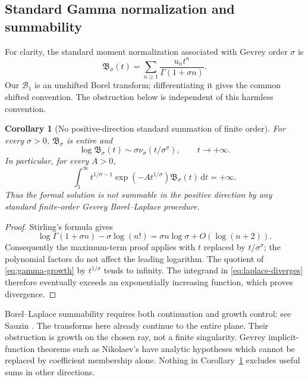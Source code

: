 \documentclass[11pt,a4paper]{article}
\numberwithin{equation}{section}
\newtheorem{corollary}[theorem]{Corollary}
\theoremstyle{definition}
\theoremstyle{remark}
\newcommand{\Bcal}{\mathcal B}
\newcommand{\dd}{\,\mathrm d}
\begin{document}
\subsection{Standard Gamma normalization and summability}
For clarity, the standard moment normalization associated with Gevrey
order $\sigma$ is
\begin{equation}
 \mathfrak B_\sigma(t)=
 \sum_{n\ge1}\frac{u_nt^n}{\Gamma(1+\sigma n)}.
 \label{eq:gamma-borel}
\end{equation}
Our $\Bcal_1$ is an unshifted Borel transform; differentiating it gives
the common shifted convention. The obstruction below is independent of
this harmless convention.

\begin{corollary}[No positive-direction standard summation of finite order]
\label{cor:no-laplace}
For every $\sigma>0$, $\mathfrak B_\sigma$ is entire and
\begin{equation}
 \log\mathfrak B_\sigma(t)
 \sim\sigma\nu_\sigma(t/\sigma^\sigma),\qquad t\to+\infty.
 \label{eq:gamma-growth}
\end{equation}
In particular, for every $A>0$,
\begin{equation}
 \int_1^\infty t^{1/\sigma-1}
 \exp(-A t^{1/\sigma})\mathfrak B_\sigma(t)\dd t=+\infty.
 \label{eq:laplace-diverges}
\end{equation}
Thus the formal solution is not summable in the positive direction by
any standard finite-order Gevrey Borel--Laplace procedure.
\end{corollary}
\begin{proof}
Stirling's formula gives
\[
 \log\Gamma(1+\sigma n)-\sigma\log(n!)
 =\sigma n\log\sigma+O(\log(n+2)).
\]
Consequently the maximum-term proof applies with $t$ replaced by
$t/\sigma^\sigma$; the polynomial factors do not affect the leading
logarithm. The quotient of \eqref{eq:gamma-growth} by $t^{1/\sigma}$
tends to infinity. The integrand in \eqref{eq:laplace-diverges}
therefore eventually exceeds an exponentially increasing function,
which proves divergence.
\end{proof}

Borel--Laplace summability requires both continuation and growth control;
see Sauzin \cite{sauzin}. The transforms here already continue to the
entire plane. Their obstruction is growth on the chosen ray, not a finite
singularity. Gevrey implicit-function theorems such as Nikolaev's
\cite{nikolaev} have analytic hypotheses which cannot be replaced by
coefficient membership alone. Nothing in Corollary~\ref{cor:no-laplace}
excludes useful sums in other directions.
\end{document}
